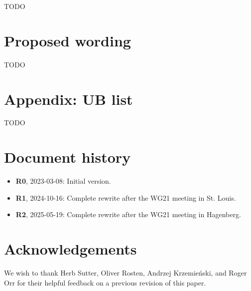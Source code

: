 TODO



\section{Proposed wording}
\label{wording}

TODO

\section*{Appendix: UB list}

TODO

\section*{Document history}
\begin{itemize}
\item \textbf{R0}, 2023-03-08: Initial version.
\item \textbf{R1}, 2024-10-16: Complete rewrite after the WG21 meeting in St. Louis.
\item \textbf{R2}, 2025-05-19: Complete rewrite after the WG21 meeting in Hagenberg.
\end{itemize}

\section*{Acknowledgements}

We wish to thank Herb Sutter, Oliver Rosten, Andrzej Krzemie\' nski, and Roger Orr for their helpful feedback on a previous revision of this paper.


\renewcommand{\addcontentsline}[3]{}%







